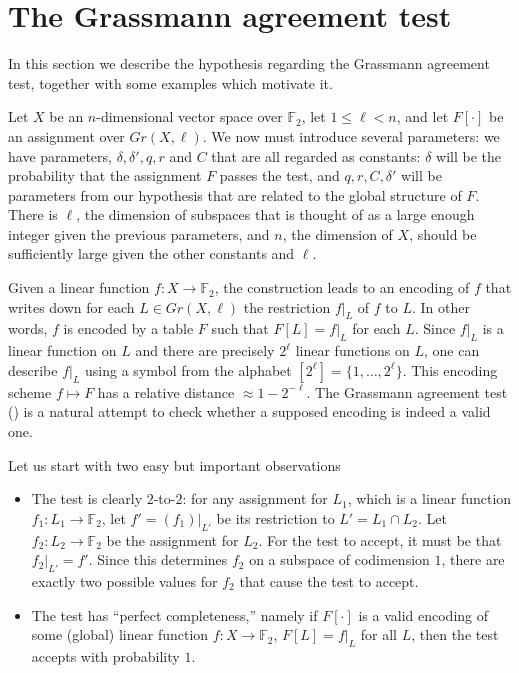 \documentclass{toc}
\renewcommand\le{\leqslant}
\def\F{\mathbb{F}}
\begin{document}
\section{The Grassmann agreement test}\label{section:grassmann}


In this section we describe the hypothesis regarding the Grassmann
agreement test, together with some examples which motivate it.

Let $X$ be an $n$-dimensional vector space over $\F_2$, let
$1\le \ell<n$, and let $F[\cdot]$ be an assignment over
$Gr(X,\ell)$. We now must introduce several parameters: we
have parameters, $\delta, \delta', q, r$ and $C$ that are all regarded
as constants: $\delta$ will be the probability that the assignment $F$ passes
the test, and $q,r,C,\delta'$ will be parameters from our hypothesis that are related to
the global structure of $F$. There is $\ell$, the dimension of subspaces that is thought of as a large enough integer given
the previous parameters, and $n$, the dimension of $X$, should be
sufficiently large given the other constants and $\ell$.


Given a linear function $f:X\to \F_2$, the construction leads to an
encoding of $f$ that writes down for each $L\in Gr(X,\ell)$ the
restriction $f|_L$ of $f$ to $L$. In other words, $f$ is encoded by a
table $F$ such that $F[L] = f|_L$ for each $L$. Since $f|_L$ is a
linear function on $L$ and there are precisely $2^\ell$ linear
functions on $L$, one can describe $f|_L$ using a symbol from the
alphabet $[2^\ell] = \{1,\ldots, 2^\ell\}$. This encoding scheme
$f \mapsto F$ has a relative distance $\approx 1-2^{-\ell}$. The
Grassmann agreement test () is a natural attempt
to check whether a supposed encoding is indeed a valid one.

\medskip \noindent
Let us start with two easy but important observations
\begin{itemize}
%
\item The test is clearly $2$-to-$2$: for any assignment for $L_1$,
  which is a linear function $f_1:L_1\to\F_2$, let $f'= (f_1)|_{L'}$ be its restriction to $L'=L_1 \cap L_2$. Let $f_2:L_2\to\F_2$ be the assignment for $L_2$. For the test to accept, it must be that $f_2|_{L'} = f'$. Since this determines $f_2$ on a subspace of codimension $1$, there are exactly two possible values for $f_2$ that cause the test to accept.
%
\item The test has ``perfect completeness,'' namely
if $F[\cdot]$ is a valid encoding of some (global) linear function $f:X \to\F_2$, $F[L]= f|_L$ for all $L$, then
the test accepts with probability $1$.
%
\end{itemize}
\end{document}
